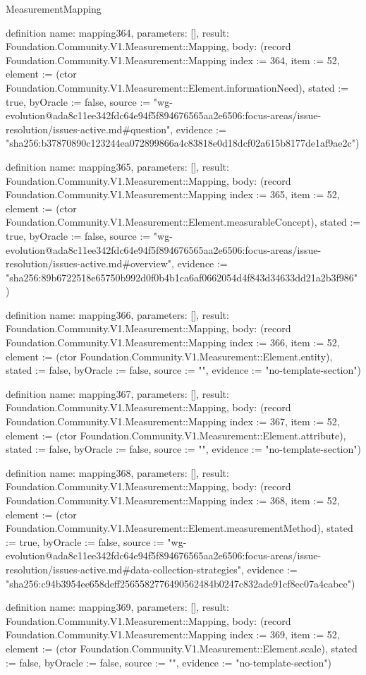 \begin{lexlean}{MeasurementMapping}
\begin{semanticmodule}
definition{
  name: mapping364,
  parameters: [],
  result: Foundation.Community.V1.Measurement::Mapping,
  body: (record Foundation.Community.V1.Measurement::Mapping {index := 364, item := 52, element := (ctor Foundation.Community.V1.Measurement::Element.informationNeed), stated := true, byOracle := false, source := "wg-evolution@ada8c11ee342fdc64e94f5f894676565aa2e6506:focus-areas/issue-resolution/issues-active.md#question", evidence := "sha256:b37870890c123244ea072899866a4c83818e0d18dcf02a615b8177de1af9ae2c"})
}

definition{
  name: mapping365,
  parameters: [],
  result: Foundation.Community.V1.Measurement::Mapping,
  body: (record Foundation.Community.V1.Measurement::Mapping {index := 365, item := 52, element := (ctor Foundation.Community.V1.Measurement::Element.measurableConcept), stated := true, byOracle := false, source := "wg-evolution@ada8c11ee342fdc64e94f5f894676565aa2e6506:focus-areas/issue-resolution/issues-active.md#overview", evidence := "sha256:89b6722518e65750b992d0f0b4b1ca6af0662054d4f843d34633dd21a2b3f986"})
}

definition{
  name: mapping366,
  parameters: [],
  result: Foundation.Community.V1.Measurement::Mapping,
  body: (record Foundation.Community.V1.Measurement::Mapping {index := 366, item := 52, element := (ctor Foundation.Community.V1.Measurement::Element.entity), stated := false, byOracle := false, source := "", evidence := "no-template-section"})
}

definition{
  name: mapping367,
  parameters: [],
  result: Foundation.Community.V1.Measurement::Mapping,
  body: (record Foundation.Community.V1.Measurement::Mapping {index := 367, item := 52, element := (ctor Foundation.Community.V1.Measurement::Element.attribute), stated := false, byOracle := false, source := "", evidence := "no-template-section"})
}

definition{
  name: mapping368,
  parameters: [],
  result: Foundation.Community.V1.Measurement::Mapping,
  body: (record Foundation.Community.V1.Measurement::Mapping {index := 368, item := 52, element := (ctor Foundation.Community.V1.Measurement::Element.measurementMethod), stated := true, byOracle := false, source := "wg-evolution@ada8c11ee342fdc64e94f5f894676565aa2e6506:focus-areas/issue-resolution/issues-active.md#data-collection-strategies", evidence := "sha256:c94b3954ee658deff2565582776490562484b0247c832ade91cf8ec07a4cabce"})
}

definition{
  name: mapping369,
  parameters: [],
  result: Foundation.Community.V1.Measurement::Mapping,
  body: (record Foundation.Community.V1.Measurement::Mapping {index := 369, item := 52, element := (ctor Foundation.Community.V1.Measurement::Element.scale), stated := false, byOracle := false, source := "", evidence := "no-template-section"})
}


\end{semanticmodule}
\end{lexlean}
